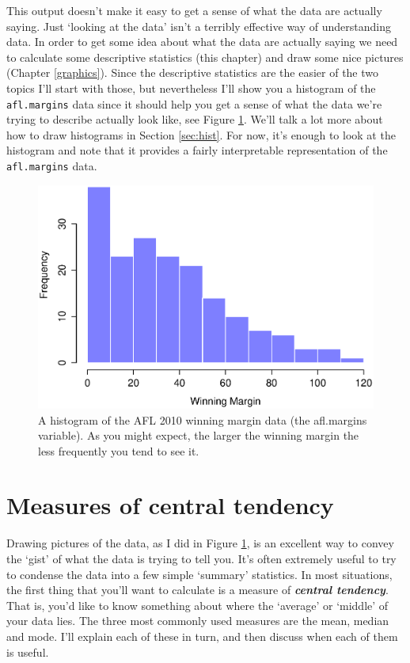 \documentclass[
]{book}
\begin{document}
This output doesn't make it easy to get a sense of what the data are actually saying. Just `looking at the data' isn't a terribly effective way of understanding data. In order to get some idea about what the data are actually saying we need to calculate some descriptive statistics (this chapter) and draw some nice pictures (Chapter \ref{graphics}). Since the descriptive statistics are the easier of the two topics I'll start with those, but nevertheless I'll show you a histogram of the \texttt{afl.margins} data since it should help you get a sense of what the data we're trying to describe actually look like, see Figure \ref{fig:histogram1}. We'll talk a lot more about how to draw histograms in Section \ref{sec:hist}. For now, it's enough to look at the histogram and note that it provides a fairly interpretable representation of the \texttt{afl.margins} data.

\begin{figure}
\centering
\includegraphics{img/descriptives/aflMargins.eps}
\caption{\label{fig:histogram1}A histogram of the AFL 2010 winning margin data (the afl.margins variable). As you might expect, the larger the winning margin the less frequently you tend to see it.}
\end{figure}

\hypertarget{centraltendency}{%
\section{Measures of central tendency}\label{centraltendency}}

Drawing pictures of the data, as I did in Figure \ref{fig:histogram1}, is an excellent way to convey the `gist' of what the data is trying to tell you. It's often extremely useful to try to condense the data into a few simple `summary' statistics. In most situations, the first thing that you'll want to calculate is a measure of \textbf{\emph{central tendency}}. That is, you'd like to know something about where the `average' or `middle' of your data lies. The three most commonly used measures are the mean, median and mode. I'll explain each of these in turn, and then discuss when each of them is useful.
\end{document}
